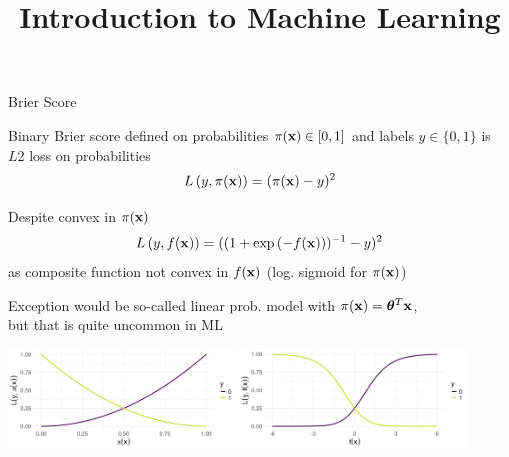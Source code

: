 \documentclass[11pt,compress,t,notes=noshow, xcolor=table]{beamer}
\title{Introduction to Machine Learning}
\begin{document}
    


\begin{vbframe}{Brier Score}

\begin{footnotesize}

\begin{itemizeM}
\item Binary Brier score defined on probabilities $\pi(\mathbf{x}) \in [0, 1]$ and labels $y \in \{0, 1\}$ is $L2$ loss on probabilities $$L\left(y, \pi(\mathbf{x})\right) = (\pi(\mathbf{x}) - y)^2$$
\item Despite convex in $\pi(\mathbf{x})$ $$L\left(y, f(\mathbf{x})\right)=((1+\exp{(-f(\mathbf{x}))})^{-1}-y)^2$$ as composite function not convex in $f(\mathbf{x})$ (log. sigmoid for $\pi(\mathbf{x})$)
\item Exception would be so-called linear prob. model with $\pi(\mathbf{x}) = \bm{\theta}^T \mathbf{x}$,\\
but that is quite uncommon in ML 
\end{itemizeM}

\begin{center}
\includegraphics[width = 0.45\textwidth]{figure/brier.png}
\includegraphics[width = 0.45\textwidth]{figure/brier_on_score.png}
\end{center}

\end{footnotesize}



\end{vbframe}
\end{document}
